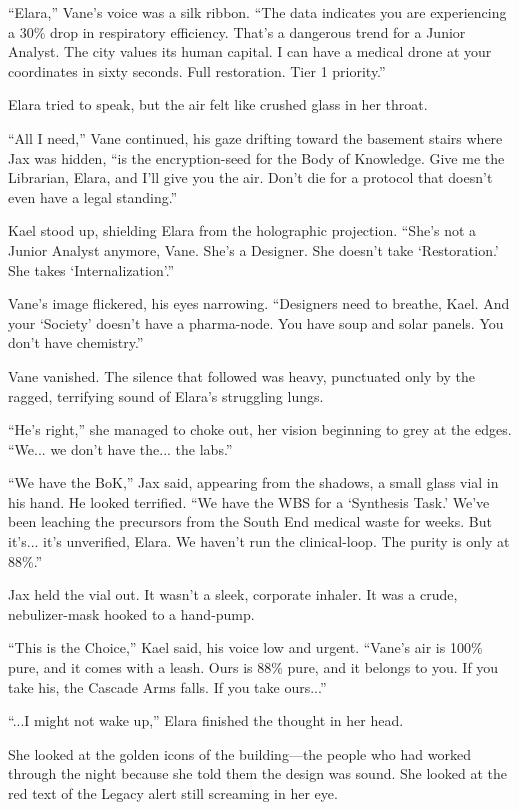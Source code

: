 ``Elara,'' Vane’s voice was a silk ribbon. ``The data indicates you are experiencing a 30\% drop in respiratory efficiency. That’s a dangerous trend for a Junior Analyst. The city values its human capital. I can have a medical drone at your coordinates in sixty seconds. Full restoration. Tier 1 priority.''

Elara tried to speak, but the air felt like crushed glass in her throat. 

``All I need,'' Vane continued, his gaze drifting toward the basement stairs where Jax was hidden, ``is the encryption-seed for the Body of Knowledge. Give me the Librarian, Elara, and I’ll give you the air. Don't die for a protocol that doesn't even have a legal standing.''

Kael stood up, shielding Elara from the holographic projection. ``She’s not a Junior Analyst anymore, Vane. She’s a Designer. She doesn't take `Restoration.' She takes `Internalization'.''

Vane’s image flickered, his eyes narrowing. ``Designers need to breathe, Kael. And your `Society' doesn't have a pharma-node. You have soup and solar panels. You don't have chemistry.''



Vane vanished. The silence that followed was heavy, punctuated only by the ragged, terrifying sound of Elara’s struggling lungs. 

``He's right,'' she managed to choke out, her vision beginning to grey at the edges. ``We... we don't have the... the labs.''

``We have the BoK,'' Jax said, appearing from the shadows, a small glass vial in his hand. He looked terrified. ``We have the WBS for a `Synthesis Task.' We’ve been leaching the precursors from the South End medical waste for weeks. But it’s... it’s unverified, Elara. We haven't run the clinical-loop. The purity is only at 88\%.''

Jax held the vial out. It wasn't a sleek, corporate inhaler. It was a crude, nebulizer-mask hooked to a hand-pump. 

``This is the Choice,'' Kael said, his voice low and urgent. ``Vane’s air is 100\% pure, and it comes with a leash. Ours is 88\% pure, and it belongs to you. If you take his, the Cascade Arms falls. If you take ours...''

``...I might not wake up,'' Elara finished the thought in her head. 

She looked at the golden icons of the building—the people who had worked through the night because she told them the design was sound. She looked at the red text of the Legacy alert still screaming in her eye. 

